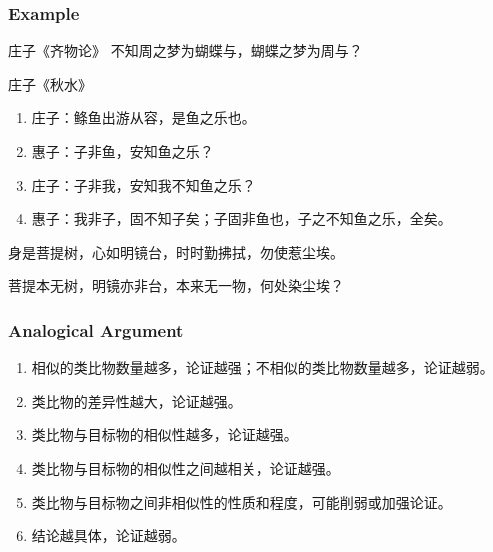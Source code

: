\documentclass[UTF8,aspectratio=43,11pt,colorlinks,compress,openany]{beamer}%
\begin{document}
\begin{frame}\frametitle{Example}
\begin{block}{庄子《齐物论》}
	不知周之梦为蝴蝶与，蝴蝶之梦为周与？
\end{block}
\begin{block}{庄子《秋水》}
\begin{enumerate}
		\item 庄子：鲦鱼出游从容，是鱼之乐也。
		\item 惠子：子非鱼，安知鱼之乐？
		\item 庄子：子非我，安知我不知鱼之乐？
		\item 惠子：我非子，固不知子矣；子固非鱼也，子之不知鱼之乐，全矣。
\end{enumerate}
\end{block}
\begin{block}{}
	身是菩提树，心如明镜台，时时勤拂拭，勿使惹尘埃。
\end{block}
\begin{block}{}
	菩提本无树，明镜亦非台，本来无一物，何处染尘埃？
\end{block}
\end{frame}

\begin{frame}\frametitle{Analogical Argument}
	\begin{prooftree}
		\noLine
		\alwaysSingleLine
	\end{prooftree}
	\begin{enumerate}
		\item 相似的类比物数量越多，论证越强；不相似的类比物数量越多，论证越弱。
		\item 类比物的差异性越大，论证越强。
		\item 类比物与目标物的相似性越多，论证越强。
		\item 类比物与目标物的相似性之间越相关，论证越强。
		\item 类比物与目标物之间非相似性的性质和程度，可能削弱或加强论证。
		\item 结论越具体，论证越弱。
	\end{enumerate}
\end{frame}
\end{document}
